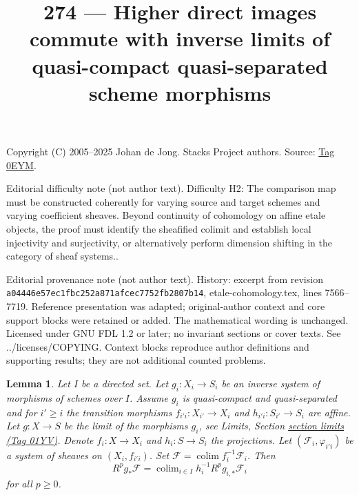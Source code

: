 \documentclass{amsart}
\theoremstyle{plain}
\newtheorem{lemma}[subsection]{Lemma}
\theoremstyle{definition}
\theoremstyle{remark}
\numberwithin{equation}{subsection}
\def\colim{\mathop{\mathrm{colim}}\nolimits}
\begin{document}
\title[Stacks Project, Tag 0EYM]{274 --- Higher direct images commute with inverse limits of quasi-compact quasi-separated scheme morphisms}
\maketitle
\noindent Copyright (C) 2005--2025 Johan de Jong. Stacks Project authors. Source: \href{https://stacks.math.columbia.edu/tag/0EYM}{Tag 0EYM}.

\noindent Editorial difficulty note (not author text). Difficulty H2: The comparison map must be constructed coherently for varying source and target schemes and varying coefficient sheaves. Beyond continuity of cohomology on affine etale objects, the proof must identify the sheafified colimit and establish local injectivity and surjectivity, or alternatively perform dimension shifting in the category of sheaf systems..

\noindent Editorial provenance note (not author text). History: excerpt from revision \texttt{a0444\allowbreak 6e57e\allowbreak c1fbc\allowbreak 252a8\allowbreak 71afc\allowbreak ec775\allowbreak 2fb28\allowbreak 07b14}, etale-cohomology.tex, lines 7566--7719. Reference presentation was adapted; original-author context and core support blocks were retained or added. The mathematical wording is unchanged. Licensed under GNU FDL 1.2 or later; no invariant sections or cover texts. See ../licenses/COPYING. Context blocks reproduce author definitions and supporting results; they are not additional counted problems.

\begin{lemma}
\label{lemma-relative-colimit-general}
Let $I$ be a directed set. Let $g_i : X_i \to S_i$ be an inverse system of
morphisms of schemes over $I$. Assume $g_i$ is quasi-compact and
quasi-separated and for $i' \geq i$ the transition morphisms
$f_{i'i} : X_{i'} \to X_i$ and $h_{i'i} : S_{i'} \to S_i$ are affine.
Let $g : X \to S$ be the limit of the morphisms $g_i$, see
Limits, Section \href{https://stacks.math.columbia.edu/tag/01YV}{section limits (Tag 01YV)}.
Denote $f_i : X \to X_i$ and $h_i : S \to S_i$ the projections.
Let $(\mathcal{F}_i, \varphi_{i'i})$ be a system of sheaves
on $(X_i, f_{i'i})$. Set $\mathcal{F} = \colim f_i^{-1}\mathcal{F}_i$. Then
$$
R^p g_* \mathcal{F} =
\colim_{i \in I} h_i^{-1}R^p g_{i, *} \mathcal{F}_i
$$
for all $p \geq 0$.
\end{lemma}
\end{document}
